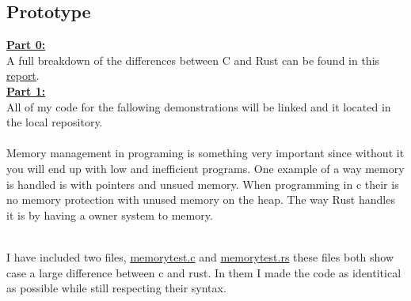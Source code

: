 \documentclass{article}
\theoremstyle{theorem}
\theoremstyle{definition}
\theoremstyle{remark}
\begin{document}
\subsection{Prototype}
\underline{ \textbf{Part 0:}} 
\\A full breakdown of the differences between C and Rust can be found in this \href{https://github.com/jacgoldberg/Programming-Lang/blob/main/Final%20Project%20354.pdf}{report}.
\\\underline{ \textbf{Part 1:}} 
\\All of my code for the fallowing demonstrations will be linked and it located in the local repository.
\\
\\Memory management in programing is something very important since without it you will end up with low and inefficient programs.
One example of a way memory is handled is with pointers and unsued memory. When programming in c their is no memory protection with unused memory on the heap.
The way Rust handles it is by having a owner system to memory.

\\I have included two files, \href{https://github.com/jacgoldberg/Programming-Lang/blob/main/CMemoryTest/memorytest.c}{memorytest.c} and \href{https://github.com/jacgoldberg/Programming-Lang/blob/main/RustMemoryTest/memorytest.rs}{memorytest.rs} 
these files both show case a large difference between c and rust. In them I made the code as identitical as possible while still respecting their syntax.
\end{document}
